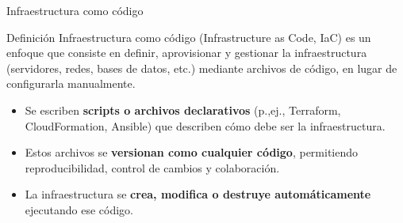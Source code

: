 \documentclass{beamer}
\begin{document}
\begin{frame}{Infraestructura como código}

\begin{block}{Definición}
    Infraestructura como código (Infrastructure as Code, IaC) es un enfoque que consiste en definir, aprovisionar y gestionar la infraestructura (servidores, redes, bases de datos, etc.) mediante archivos de código, en lugar de configurarla manualmente.
\end{block}

\begin{itemize}
\item Se escriben \textbf{scripts o archivos declarativos} (p.,ej., Terraform, CloudFormation, Ansible) que describen cómo debe ser la infraestructura.
\item Estos archivos se \textbf{versionan como cualquier código}, permitiendo reproducibilidad, control de cambios y colaboración.
\item La infraestructura se \textbf{crea, modifica o destruye automáticamente} ejecutando ese código.
\end{itemize}
    
\end{frame}
\end{document}
